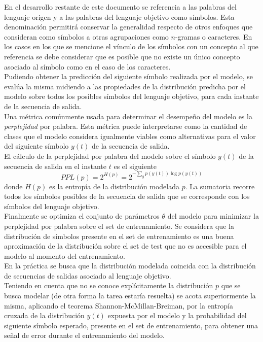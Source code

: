\documentclass{article}
\begin{document}
	En el desarrollo restante de este documento se referencia a las palabras del lenguaje origen y a las palabras del lenguaje objetivo como símbolos. Esta denominación permitirá conservar la generalidad respecto de otros enfoques que consideran como símbolos a otras agrupaciones como $n$-gramas o caracteres. En los casos en los que se mencione el vínculo de los símbolos con un concepto al que referencia se debe considerar que es posible que no existe un único concepto asociado al símbolo como en el caso de los caracteres.\\
	
	Pudiendo obtener la predicción del siguiente símbolo realizada por el modelo, se evalúa la misma midiendo a las propiedades de la distribución predicha por el modelo sobre todos los posibles símbolos del lenguaje objetivo, para cada instante de la secuencia de salida. \\
	Una métrica comúnmente usada para determinar el desempeño del modelo es la \textit{perplejidad} por palabra. Esta métrica puede interpretarse como la cantidad de clases que el modelo considera igualmente viables como alternativas para el valor del siguiente símbolo $y(t)$ de la secuencia de salida.\\
	El cálculo de la perplejidad por palabra del modelo sobre el símbolo $y(t)$ de la secuencia de salida en el instante $t$ es el siguiente
	\begin{equation*}
	PPL(p)=2^{H(p)} = 2^{-\sum_{y} p(y(t))\log p(y(t))}
	\end{equation*}
	donde $H(p)$ es la entropía de la distribución modelada $p$. La sumatoria recorre todos los símbolos posibles de la secuencia de salida que se corresponde con los símbolos del lenguaje objetivo.\\
	
	Finalmente se optimiza el conjunto de parámetros $\theta$ del modelo para minimizar la perplejidad por palabra sobre el set de entrenamiento. Se considera que la distribución de símbolos presente en el set de entrenamiento es una buena aproximación de la distribución sobre el set de test que no es accesible para el modelo al momento del entrenamiento.\\
	
	En la práctica se busca que la distribución modelada coincida con la distribución de secuencias de salidas asociado al lenguaje objetivo. \\
	Teniendo en cuenta que no se conoce explícitamente la distribución $p$ que se busca modelar (de otra forma la tarea estaría resuelta) se acota superiormente la misma\cite{34JurafskyBook}, aplicando el teorema Shannon-McMillan-Breiman, por la entropía cruzada de la distribución $y(t)$ expuesta por el modelo y la probabilidad del siguiente símbolo esperado, presente en el set de entrenamiento, para obtener una señal de error durante el entrenamiento del modelo.\\
	
\end{document}
